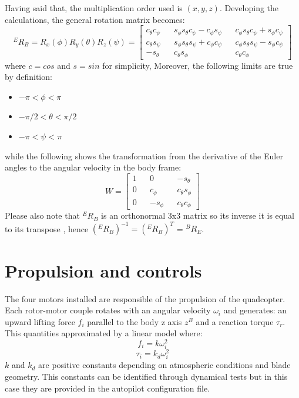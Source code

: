 \noindent
Having said that, the multiplication order used is $(x , y , z)$. Developing the calculations, the general rotation matrix becomes:\begin{equation}
{}^ER_B = R_x(\phi)R_y(\theta)R_z(\psi) = \begin{bmatrix} 
c_\theta c_\psi && s_\phi s_\theta c_\psi - c_\phi s _\psi &&  c_\phi s_\theta c_\psi + s_\phi c _\psi \\
c_\theta s_\psi&& s_\phi s_\theta s_\psi + c_\phi c _\psi && c_\phi s_\theta  s_\psi - s_\phi c _\psi \\
-s_\theta && c_\theta s_\phi  &&  c_\theta c_\phi 
\end{bmatrix}
\label{eq:rotmatrix}
\end{equation}where $c = cos$ and $s = sin$ for simplicity, Moreover, the following limits are true by definition: \begin{itemize}
\item $ -\pi < \phi < \pi$
\item $ -\pi/2 < \theta < \pi/2$
\item $ -\pi < \psi < \pi$
\end{itemize}
while the following shows the transformation from the derivative of the Euler angles to the angular velocity in the body frame\cite{Friis2009}:
\begin{equation}
W = \begin{bmatrix} 
1 && 0 && -s_\theta\\
0 && c_\phi && c_\theta s_\phi \\
0 && -s_\phi && c_\theta c_\phi
\end{bmatrix}
\end{equation}
Please also note that ${}^ER_B$ is an orthonormal 3x3 matrix so its inverse it is equal to its transpose \cite{Khalil2004}, hence $({}^ER_B)^{-1} = ({}^ER_B)^{T}$ = ${}^BR_E$.

\section{Propulsion and controls}
\label{sec:propulsion}

The four motors installed are responsible of the propulsion of the quadcopter. Each rotor-motor couple rotates with an angular velocity $\omega_i$ and generates: an upward lifting force $f_i$ parallel to the body z axis $z^B$ and a reaction torque $\tau_r$. This quantities approximated by a linear model where: \begin{equation}
f_i = k \omega_i ^ 2
\label{eq:fi}
\end{equation}
\begin{equation}
\tau_i = k_d \omega_i ^ 2
\label{eq:taui}
\end{equation}
$k$ and $k_d$ are positive constants depending on atmospheric conditions and blade geometry. This constants can be identified through dynamical tests but in this case they are provided in the autopilot configuration file.\\


